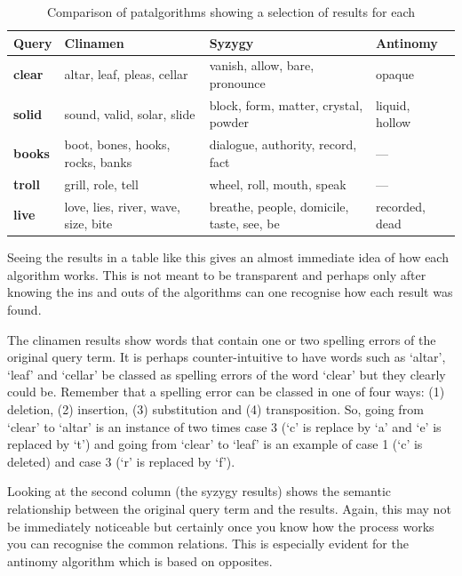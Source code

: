 \begin{table}[!htbp]
\caption[Comparison of patalgorithms]{Comparison of patalgorithms showing a selection of results for each}
\label{tab:algorithmscomp}
  \begin{tabu}{X[1,L]X[3,L]X[3,L]X[2,L]}
  \toprule
  \textbf{Query} & \textbf{Clinamen} & \textbf{Syzygy} & \textbf{Antinomy}
  \\ \midrule
  \textbf{clear}
  &
  altar, leaf, pleas, cellar
  &
  vanish, allow, bare, pronounce
  &
  opaque
  \\ 
  \textbf{solid}
  &
  sound, valid, solar, slide
  &
  block, form, matter, crystal, powder
  &
  liquid, hollow
  \\ 
  \textbf{books}
  &
  boot, bones, hooks, rocks, banks
  &
  dialogue, authority, record, fact
  &
  ---
  \\ 
  \textbf{troll}
  &
  grill, role, tell
  &
  wheel, roll, mouth, speak
  &
  ---
  \\ 
  \textbf{live}
  &
  love, lies, river, wave, size, bite
  &
  breathe, people, domicile, taste, see, be
  &
  recorded, dead
  \\ \bottomrule
  \end{tabu}
\end{table}

Seeing the results in a table like this gives an almost immediate idea of how each algorithm works. This is not meant to be transparent and perhaps only after knowing the ins and outs of the algorithms can one recognise how each result was found. 

The clinamen results show words that contain one or two spelling errors of the original query term. It is perhaps counter-intuitive to have words such as `altar', `leaf' and `cellar' be classed as spelling errors of the word `clear' but they clearly could be. Remember that a spelling error can be classed in one of four ways: (1) deletion, (2) insertion, (3) substitution and (4) transposition. So, going from `clear' to `altar' is an instance of two times case 3 (`c' is replace by `a' and `e' is replaced by `t') and going from  `clear' to `leaf' is an example of case 1 (`c' is deleted) and case 3 (`r' is replaced by `f').

Looking at the second column (the syzygy results) shows the semantic relationship between the original query term and the results. Again, this may not be immediately noticeable but certainly once you know how the process works you can recognise the common relations. This is especially evident for the antinomy algorithm which is based on opposites.

